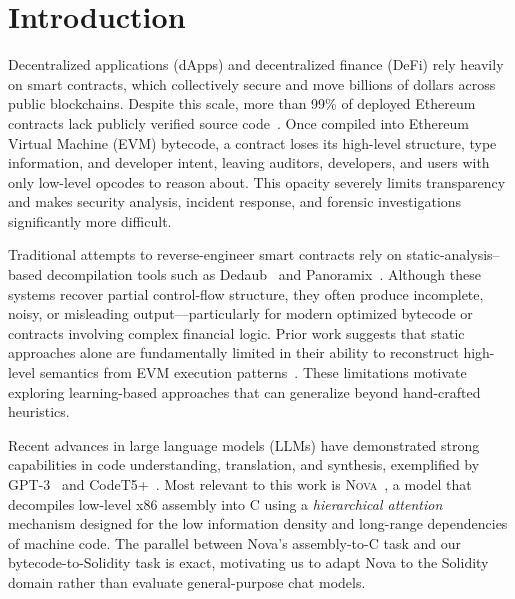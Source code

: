 \documentclass{stylefiles/capstone}
\begin{document}

\maketitle

\section{Introduction}

Decentralized applications (dApps) and decentralized finance (DeFi) rely heavily
on smart contracts, which collectively secure and move billions of dollars across
public blockchains. Despite this scale, more than 99\% of deployed Ethereum
contracts lack publicly verified source code~\cite{etherscan}. Once compiled into
Ethereum Virtual Machine (EVM) bytecode, a contract loses its high-level
structure, type information, and developer intent, leaving auditors, developers,
and users with only low-level opcodes to reason about. This opacity severely
limits transparency and makes security analysis, incident response, and forensic
investigations significantly more difficult.

Traditional attempts to reverse-engineer smart contracts rely on
static-analysis–based decompilation tools such as Dedaub~\cite{neville2023dedaub}
and Panoramix~\cite{panoramix}. Although these systems recover partial
control-flow structure, they often produce incomplete, noisy, or misleading
output—particularly for modern optimized bytecode or contracts involving complex
financial logic. Prior work suggests that static approaches alone are
fundamentally limited in their ability to reconstruct high-level semantics from
EVM execution patterns~\cite{darwish2023bytecode}. These limitations motivate
exploring learning-based approaches that can generalize beyond hand-crafted
heuristics.

Recent advances in large language models (LLMs) have demonstrated strong
capabilities in code understanding, translation, and synthesis, exemplified by
GPT-3~\cite{brown2020language} and CodeT5+~\cite{wang2023codet5plus}. Most
relevant to this work is \textsc{Nova}~\cite{jiang2025nova}, a model that
decompiles low-level x86 assembly into C using a \emph{hierarchical attention}
mechanism designed for the low information density and long-range dependencies of
machine code. The parallel between Nova's assembly-to-C task and our
bytecode-to-Solidity task is exact, motivating us to adapt Nova to the Solidity
domain rather than evaluate general-purpose chat models.
\end{document}
